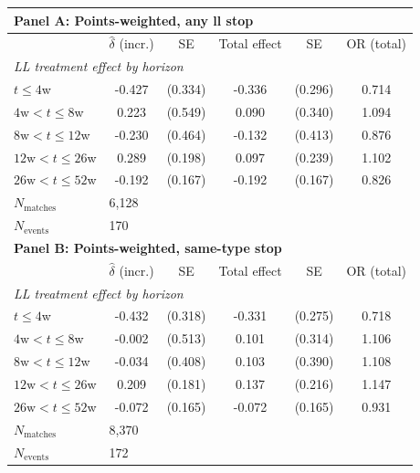 \begin{tabular}{lccccc}
\toprule
\multicolumn{6}{l}{\textbf{Panel A: Points-weighted, any ll stop}} \\
\midrule
 & $\hat{\delta}$ (incr.) & SE & Total effect & SE & OR (total) \\
\midrule
\multicolumn{6}{l}{\textit{LL treatment effect by horizon}} \\
$t \leq 4$w & -0.427 & (0.334) & -0.336 & (0.296) & 0.714 \\
$4\text{w} < t \leq 8$w & 0.223 & (0.549) & 0.090 & (0.340) & 1.094 \\
$8\text{w} < t \leq 12$w & -0.230 & (0.464) & -0.132 & (0.413) & 0.876 \\
$12\text{w} < t \leq 26$w & 0.289 & (0.198) & 0.097 & (0.239) & 1.102 \\
$26\text{w} < t \leq 52$w & -0.192 & (0.167) & -0.192 & (0.167) & 0.826 \\
[4pt]
$N_{\text{matches}}$ & \multicolumn{5}{l}{6,128} \\
$N_{\text{events}}$ & \multicolumn{5}{l}{170} \\
\midrule
\multicolumn{6}{l}{\textbf{Panel B: Points-weighted, same-type stop}} \\
\midrule
 & $\hat{\delta}$ (incr.) & SE & Total effect & SE & OR (total) \\
\midrule
\multicolumn{6}{l}{\textit{LL treatment effect by horizon}} \\
$t \leq 4$w & -0.432 & (0.318) & -0.331 & (0.275) & 0.718 \\
$4\text{w} < t \leq 8$w & -0.002 & (0.513) & 0.101 & (0.314) & 1.106 \\
$8\text{w} < t \leq 12$w & -0.034 & (0.408) & 0.103 & (0.390) & 1.108 \\
$12\text{w} < t \leq 26$w & 0.209 & (0.181) & 0.137 & (0.216) & 1.147 \\
$26\text{w} < t \leq 52$w & -0.072 & (0.165) & -0.072 & (0.165) & 0.931 \\
[4pt]
$N_{\text{matches}}$ & \multicolumn{5}{l}{8,370} \\
$N_{\text{events}}$ & \multicolumn{5}{l}{172} \\
\bottomrule
\end{tabular}
